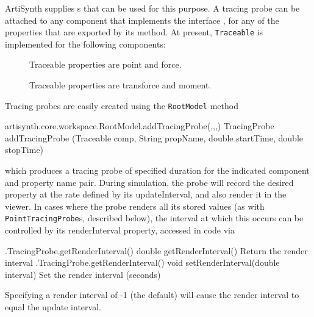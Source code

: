 ArtiSynth supplies s that can be used for this
purpose.  A tracing probe can be attached to any component that implements the
interface
, for any of the properties that
are exported by its 
 method.
At present, {\tt Traceable} is implemented for the following components:

\begin{description}

\item[]\mbox{}

Traceable properties are {\sf point} and {\sf force}.

\item[]\mbox{}

Traceable properties are {\sf transforce} and {\sf moment}.

\end{description}


Tracing probes are easily created using the {\tt RootModel} method
%
\begin{methodtable}{0.95}{0.05}
%
\methodentry
{artisynth.core.workspace.RootModel.addTracingProbe(,,,)}%
{TracingProbe addTracingProbe (Traceable comp, String propName,
double startTime, double stopTime)}%
{\ }%
%
\end{methodtable}
%
which produces a tracing probe of specified duration for the indicated
component and property name pair. During simulation, the probe will record the
desired property at the rate defined by its {\sf updateInterval}, and also
render it in the viewer. In cases where the probe renders all its stored values
(as with {\tt PointTracingProbe}s, described below), the interval at which this
occurs can be controlled by its {\sf renderInterval} property, accessed
in code via
%
\begin{methodtable}{0.5}{0.5}
%
\methodentry
{\probes.TracingProbe.getRenderInterval()}%
{double getRenderInterval()}%
{Return the render interval}%
%
\methodentry
{\probes.TracingProbe.getRenderInterval()}%
{void setRenderInterval(double interval)}%
{Set the render interval (seconds)}%
%
\end{methodtable}
%
Specifying a render interval of -1 (the default) will cause
the render interval to equal the update interval.

